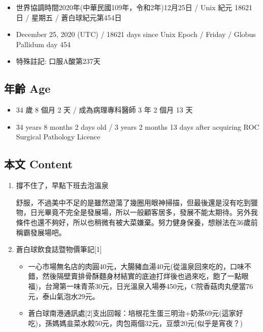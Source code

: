 \documentclass[a5paper, 10pt
]{book}
\providecommand{\tightlist}{%
  \setlength{\itemsep}{0pt}\setlength{\parskip}{0pt}}
\begin{document}
\begin{itemize}
\tightlist
\item
  世界協調時間2020年(中華民國109年，令和2年)12月25日 / Unix 紀元 18621
  日 / 星期五 / 蒼白球紀元第454日
\item
  December 25, 2020 (UTC) / 18621 days since Unix Epoch / Friday /
  Globus Pallidum day 454
\item
  特殊註記: 口服A酸第237天
\end{itemize}

\hypertarget{ux5e74ux9f61-age-24}{%
\subsection{年齡 Age}\label{ux5e74ux9f61-age-24}}

\begin{itemize}
\tightlist
\item
  34 歲 8 個月 2 天 / 成為病理專科醫師 3 年 2 個月 13 天
\item
  34 years 8 months 2 days old / 3 years 2 months 13 days after
  acquiring ROC Surgical Pathology Licence
\end{itemize}

\hypertarget{ux672cux6587-content-24}{%
\subsection{本文 Content}\label{ux672cux6587-content-24}}

\begin{enumerate}
\def\labelenumi{\arabic{enumi}.}
\item
  撐不住了，早點下班去泡溫泉

  舒服，不過美中不足的是雖然遊蕩了幾圈用眼神掃描，但最後還是沒有吃到獵物，日光畢竟不完全是發展場，所以一般顧客居多，發展不能太期待。另外我條件也還不夠好，所以也稍微有被大菜嫌棄。努力健身保養，想辦法在36歲前稱霸發展場吧。
\item
  蒼白球飲食誌暨物價筆記{[}1{]}

  \begin{itemize}
  \tightlist
  \item
    一心市場無名店的肉圓40元，大腸豬血湯40元(從溫泉回來吃的，口味不錯，然後隔壁賣排骨酥麵身材結實的底迪打烊後也過來吃，飽了一點眼福)，台灣第一味青茶30元，日光溫泉入場券450元，C院香菇肉丸便當76元，泰山氣泡水29元。
  \item
    蒼白球南港通訊處{[}2{]}支出回報：培根花生蛋三明治+奶茶69元(這家好吃)，孫媽媽韭菜水餃50元，肉包兩個32元，豆漿20元(似乎是宵夜？)
  \end{itemize}
\end{enumerate}
\end{document}
